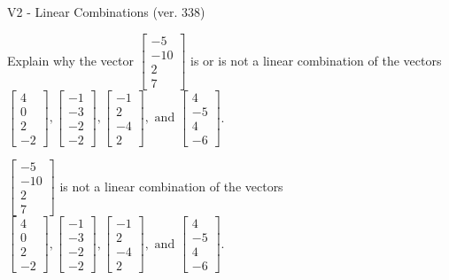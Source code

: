 \begin{exercise}
  \begin{exerciseTitle}V2 - Linear Combinations (ver. 338)\end{exerciseTitle}
  \begin{exerciseStatement}
    Explain why the vector \(\left[\begin{array}{c}
-5 \\
-10 \\
2 \\
7
\end{array}\right]\)  is or is not a linear 
	combination of the vectors \(\left[\begin{array}{c}
4 \\
0 \\
2 \\
-2
\end{array}\right] , \left[\begin{array}{c}
-1 \\
-3 \\
-2 \\
-2
\end{array}\right] , \left[\begin{array}{c}
-1 \\
2 \\
-4 \\
2
\end{array}\right] , \text{ and } \left[\begin{array}{c}
4 \\
-5 \\
4 \\
-6
\end{array}\right]\).
	


  \end{exerciseStatement}
  \begin{exerciseAnswer}
   \(\left[\begin{array}{c}
-5 \\
-10 \\
2 \\
7
\end{array}\right]\) 
  	 is not  
	a linear combination of the vectors \(\left[\begin{array}{c}
4 \\
0 \\
2 \\
-2
\end{array}\right] , \left[\begin{array}{c}
-1 \\
-3 \\
-2 \\
-2
\end{array}\right] , \left[\begin{array}{c}
-1 \\
2 \\
-4 \\
2
\end{array}\right] , \text{ and } \left[\begin{array}{c}
4 \\
-5 \\
4 \\
-6
\end{array}\right]\).


\end{exerciseAnswer}
\end{exercise}
